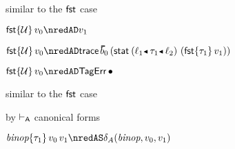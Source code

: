 {\begin{lamportproof*}
    \begin{pfproof}
      \qedstep
        \begin{pfproof}
          similar to the $\mathsf{fst}$ case
        \end{pfproof}
    \end{pfproof}

    \begin{pfproof}
        \begin{pfproof}
          \qedstep
            \begin{pfproof}
              $\efst{\tdyn}{\svalue_0} \nredAD \svalue_1$
            \end{pfproof}
        \end{pfproof}
        \begin{pfproof}
          \qedstep
            \begin{pfproof}
              $\efst{\tdyn}{\svalue_0} \nredAD \eprehist{\sblist_0}{(\estab{\obnd{\sowner_1}{\stype_1}{\sowner_2}}{(\efst{\stype_1}{\svalue_1})})}$
            \end{pfproof}
        \end{pfproof}
        \begin{pfproof}
          \qedstep
            \begin{pfproof}
              $\efst{\tdyn}{\svalue_0} \nredAD \tagerrorD$
            \end{pfproof}
        \end{pfproof}
    \end{pfproof}

    \begin{pfproof}
      \qedstep
        \begin{pfproof}
          similar to the $\mathsf{fst}$ case
        \end{pfproof}
    \end{pfproof}

    \begin{pfproof}
        \begin{pfproof}
          by $\vdash_{\mathsf{A}}$ canonical forms
        \end{pfproof}
      \qedstep
        \begin{pfproof}
          $\ebinopt{\stype_1}{\svalue_0}{\svalue_1} \nredAS \sdeltaA(\sbinop, \svalue_0, \svalue_1)$
        \end{pfproof}
    \end{pfproof}


\end{lamportproof*}}
